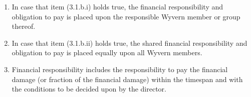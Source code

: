 \begin{enumerate}
\begin{item}
\begin{enumerate}
            \item In case that item (3.1.b.i) holds true, the financial responsibility and obligation to pay is placed upon the responsible Wyvern member or group thereof.
            
            \item In case that item (3.1.b.ii) holds true, the shared financial responsibility and obligation to pay is placed equally upon all Wyvern members.
            
            \item Financial responsibility includes the responsibility to pay the financial damage (or fraction of the financial damage) within the timespan and with the conditions to be decided upon by the director.
        \end{enumerate}

    \end{item}
\end{enumerate}

\newpage
